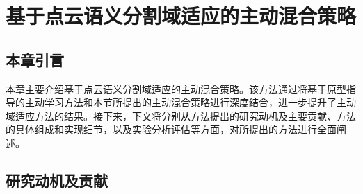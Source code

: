 \chapter{基于点云语义分割域适应的主动混合策略}
\thispagestyle{others}
\pagestyle{others}
\xiaosi

    \section{本章引言}
    本章主要介绍基于点云语义分割域适应的主动混合策略。该方法通过将基于原型指导的主动学习方法和本节所提出的主动混合策略进行深度结合，进一步提升了主动域适应方法的结果。接下来，下文将分别从方法提出的研究动机及主要贡献、方法的具体组成和实现细节，以及实验分析评估等方面，对所提出的方法进行全面阐述。 

    \section{研究动机及贡献}
